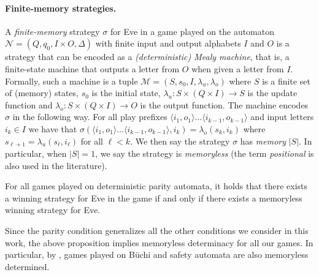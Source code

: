 \documentclass[runningheads,a4paper,draft]{llncs}
\newcommand{\eve}{Eve\xspace}
\newcommand{\calN}{\mathcal{N}}
\newcommand{\calM}{\mathcal{M}}
\begin{document}
\paragraph{Finite-memory strategies.}
A \emph{finite-memory} strategy $\sigma$ for \eve in a game played on the
automaton $\calN = (Q,q_0,I \times O,\Delta)$ with finite input and output
alphabets $I$ and $O$ is a strategy that can be encoded as a
\emph{(deterministic) Mealy machine}, that is, a finite-state machine that
outputs a letter from \(O\) when given a letter from \(I\).  Formally, such a
machine is a tuple $\calM = (S,s_0,I, \lambda_u,\lambda_o)$ where $S$ is a
finite set of (memory) states, $s_0$ is the initial state,
$\lambda_u\colon S \times (Q \times I) \to S$ is the update function and
$\lambda_o\colon S \times (Q \times I) \to O$ is the output function. The
machine encodes $\sigma$ in the following way. For all play prefixes
$\langle i_1, o_1\rangle \dots \langle i_{k-1}, o_{k-1} \rangle$ and input
letters $i_k \in I$ we have that
$\sigma(\langle i_1, o_1\rangle \dots \langle i_{k-1}, o_{k-1} \rangle, i_k) =
\lambda_o(s_k,i_k)$ where $s_{\ell + 1} = \lambda_u(s_\ell,i_\ell)$ for all
$\ell < k$. We then say the strategy $\sigma$ has \emph{memory} $|S|$. In
particular, when $|S| = 1$, we say the strategy is \emph{memoryless} (the term
\emph{positional} is also used in the literature).

\begin{proposition}
  \label{prop:det}%
  For all games played on deterministic parity automata, it holds that there
  exists a winning strategy for \eve in the game if and only if there exists a
  memoryless winning strategy for \eve.
\end{proposition}
Since the parity condition generalizes all the other conditions we consider in
this work, the above proposition implies memoryless determinacy for all our
games.  In particular, by , games played on Büchi and safety
automata are also memoryless determined.
\end{document}
